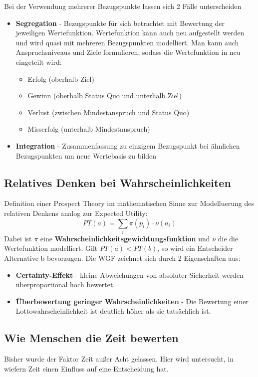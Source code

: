 Bei der Verwendung mehrerer Bezugspunkte lassen sich 2 Fälle unterscheiden
\begin{itemize}
    \item \textbf{Segregation} - Bezugspunkte für sich betrachtet mit
        Bewertung der jeweiligen Wertefunktion. Wertefunktion kann auch
        neu aufgestellt werden und wird quasi mit mehreren Bezugspunkten
        modelliert. Man kann auch Anspruchsniveaus und Ziele formulieren,
        sodass die Wertefunktion in neu eingeteilt wird:
        \begin{itemize}
            \item Erfolg (oberhalb Ziel)
            \item Gewinn (oberhalb Status Quo und unterhalb Ziel)
            \item Verlust (zwischen Mindestanspruch und Status Quo)
            \item Misserfolg (unterhalb Mindestanspruch)
        \end{itemize}
    \item \textbf{Integration} - Zusammenfassung zu einzigem Bezugspunkt bei
        ähnlichen Bezugspunkten um neue Wertebasis zu bilden
\end{itemize}

\subsection{Relatives Denken bei Wahrscheinlichkeiten}
Definition einer Prospect Theory im mathematischen Sinne zur Modelluerung
des relativen Denkens analog zur Expected Utility:
\begin{equation}
    PT(a) = \sum_i \pi(p_i) \cdot \nu(a_i)
\end{equation}
Dabei ist $\pi$ eine \textbf{Wahrscheinlichkeitsgewichtungsfunktion} und $\nu$
die die Wertefunktion modelliert.
Gilt $PT(a) < PT(b)$, so wird ein Entscheider Alternative b bevorzugen.
Die WGF zeichnet sich durch 2 Eigenschaften aus:
\begin{itemize}
    \item \textbf{Certainty-Effekt} - kleine Abweichungen von absoluter Sicherheit
        werden überproportional hoch bewertet.
    \item \textbf{Überbewertung geringer Wahrscheinlichkeiten} - Die Bewertung
        einer Lottowahrscheinlichkeit ist deutlich höher als sie tatsächlich ist.
\end{itemize}

\subsection{Wie Menschen die Zeit bewerten}
Bisher wurde der Faktor Zeit außer Acht gelassen. Hier wird untersucht,
in wiefern Zeit einen Einfluss auf eine Entscheidung hat.

